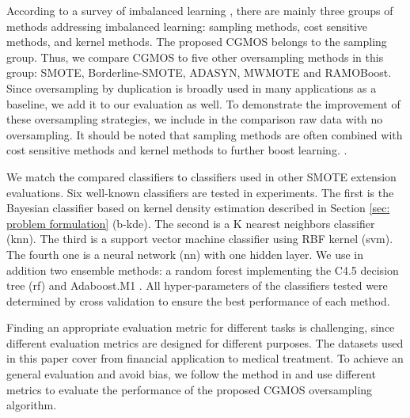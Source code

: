 \documentclass{iitthesis}
\begin{document}
 According to a survey of imbalanced learning \cite{HH:09}, there are mainly three groups of methods addressing imbalanced learning: sampling methods, cost sensitive methods, and kernel methods. The proposed CGMOS belongs to the sampling group. Thus, we compare CGMOS to five other oversampling methods in this group: SMOTE\cite{CNV:02}, Borderline-SMOTE\cite{HH:05}, ADASYN\cite{HH:08}, MWMOTE\cite{barua2014mwmote} and RAMOBoost\cite{chen2010ramoboost}. Since oversampling by duplication is broadly used in many applications as a baseline, we add it to our evaluation as well. To demonstrate the improvement of these oversampling strategies, we include in the comparison raw data with no oversampling. It should be noted that sampling methods are often combined with cost sensitive methods and kernel methods to further boost learning. \cite{chawla2004editorial}\cite{chawla2003smoteboost}\cite{guo2004learning}.

 We match the compared classifiers to classifiers used in other SMOTE extension evaluations. Six well-known classifiers are tested in experiments. The first is the Bayesian classifier based on kernel density estimation described in Section \ref{sec: problem formulation} (b-kde). The second is a K nearest neighbors classifier (knn). The third is a support vector machine classifier using RBF kernel (svm). The fourth one is a neural network (nn) with one hidden layer. We use in addition two ensemble methods: a random forest implementing the C4.5 decision tree \cite{Quinlan:1993} (rf) and Adaboost.M1 \cite{fy:1996}. All hyper-parameters of the classifiers tested were determined by cross validation to ensure the best performance of each method.

 Finding an appropriate evaluation metric for different tasks is challenging, since different evaluation metrics are designed for different purposes. The datasets used in this paper cover from financial application to medical treatment. To achieve an general evaluation and avoid bias, we follow the method in \cite{CNV:02}\cite{HH:05}\cite{HH:08}\cite{barua2014mwmote}\cite{chen2010ramoboost} and use different metrics to evaluate the performance of the proposed CGMOS oversampling algorithm.
\end{document}

